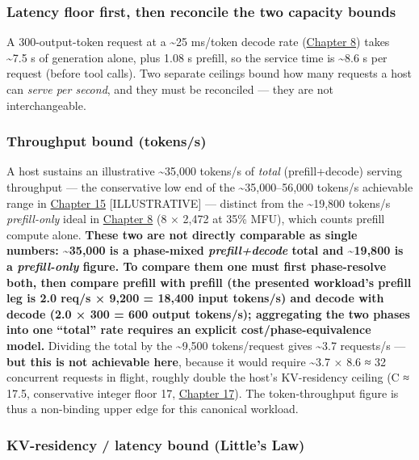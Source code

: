 \subsubsection{Latency floor first, then reconcile the two capacity
bounds}\label{latency-floor-first-then-reconcile-the-two-capacity-bounds}

A 300-output-token request at a \textasciitilde25 ms/token decode rate
(\hyperref[chap:8]{Chapter 8}) takes \textasciitilde7.5 s of generation alone, plus 1.08 s
prefill, so the service time is \textasciitilde8.6 s per request (before
tool calls). Two separate ceilings bound how many requests a host can
\emph{serve per second}, and they must be reconciled --- they are not
interchangeable.

\subsubsection{Throughput bound
(tokens/s)}\label{throughput-bound-tokenss}

A host sustains an illustrative \textasciitilde35,000 tokens/s of
\emph{total} (prefill+decode) serving throughput --- the conservative
low end of the \textasciitilde35,000--56,000 tokens/s achievable range
in \hyperref[chap:15]{Chapter 15} \mbox{{[}ILLUSTRATIVE{]}} --- distinct from the
\textasciitilde19,800 tokens/s \emph{prefill-only} ideal in \hyperref[chap:8]{Chapter 8} (8
× 2,472 at 35\% MFU), which counts prefill compute alone. \textbf{These
two are not directly comparable as single numbers: \textasciitilde35,000
is a phase-mixed \emph{prefill+decode} total and \textasciitilde19,800
is a \emph{prefill-only} figure. To compare them one must first
phase-resolve both, then compare prefill with prefill (the presented
workload's prefill leg is 2.0 req/s × 9,200 = 18,400 input tokens/s) and
decode with decode (2.0 × 300 = 600 output tokens/s); aggregating the
two phases into one ``total'' rate requires an explicit
cost/phase-equivalence model.} Dividing the total by the
\textasciitilde9,500 tokens/request gives \textasciitilde3.7 requests/s
--- \textbf{but this is not achievable here}, because it would require
\textasciitilde3.7 × 8.6 ≈ 32 concurrent requests in flight, roughly
double the host's KV-residency ceiling (C ≈ 17.5, conservative integer
floor 17, \hyperref[chap:17]{Chapter 17}). The token-throughput figure is thus a non-binding
upper edge for this canonical workload.

\subsubsection{KV-residency / latency bound (Little's
Law)}\label{kv-residency-latency-bound-littles-law}

